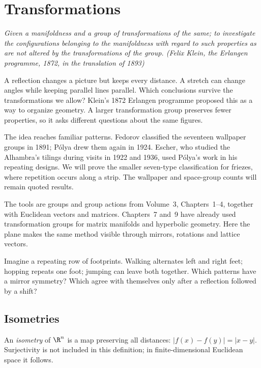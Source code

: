 \chapter{Transformations}\label{geometry:ch:transformations}

\begin{center}\itshape
Given a manifoldness and a group of transformations of the same; to investigate the configurations belonging to the
manifoldness with regard to such properties as are not altered by the transformations of the group.
\upshape(Felix Klein, the Erlangen programme, 1872, in the translation of 1893)
\end{center}

A reflection changes a picture but keeps every distance. A stretch can change angles while keeping parallel lines parallel. Which conclusions survive the transformations we allow? Klein's 1872 Erlangen programme proposed this as a way to organize geometry. A larger transformation group preserves fewer properties, so it asks different questions about the same figures.

The idea reaches familiar patterns. Fedorov classified the seventeen wallpaper groups in 1891; P\'olya drew them again in 1924. Escher, who studied the Alhambra's tilings during visits in 1922 and 1936, used P\'olya's work in his repeating designs. We will prove the smaller seven-type classification for friezes, where repetition occurs along a strip. The wallpaper and space-group counts will remain quoted results.

The tools are groups and group actions from Volume~3, Chapters~1--4, together with Euclidean vectors and matrices. Chapters~7 and~9 have already used transformation groups for matrix manifolds and hyperbolic geometry. Here the plane makes the same method visible through mirrors, rotations and lattice vectors.

\begin{think}
Imagine a repeating row of footprints. Walking alternates left and right feet; hopping repeats one foot; jumping can leave both together. Which patterns have a mirror symmetry? Which agree with themselves only after a reflection followed by a shift?
\end{think}

\section{Isometries}

An \emph{isometry} of $\R^n$ is a map preserving all distances: $|f(x)-f(y)|=|x-y|$. Surjectivity is not included in this definition; in finite-dimensional Euclidean space it follows.

